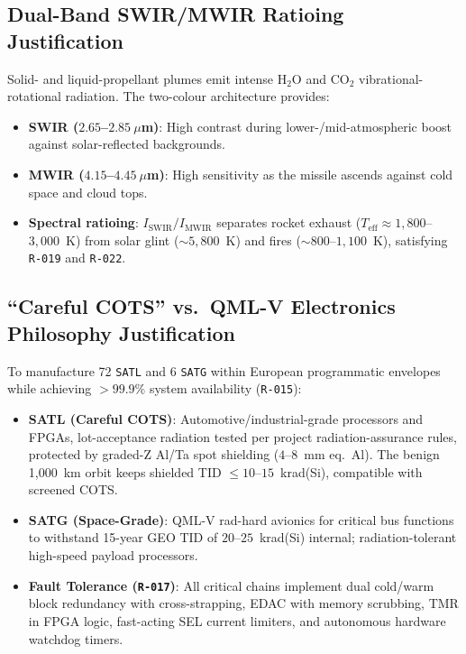 \subsection{Dual-Band SWIR/MWIR Ratioing Justification}

Solid- and liquid-propellant plumes emit intense $\mathrm{H_2O}$ and $\mathrm{CO_2}$ vibrational-rotational radiation. The two-colour architecture provides:
\begin{itemize}
    \item \textbf{SWIR ($2.65$--$2.85~\mu$m)}: High contrast during lower-/mid-atmospheric boost against solar-reflected backgrounds.
    \item \textbf{MWIR ($4.15$--$4.45~\mu$m)}: High sensitivity as the missile ascends against cold space and cloud tops.
    \item \textbf{Spectral ratioing}: $I_{\text{SWIR}}/I_{\text{MWIR}}$ separates rocket exhaust ($T_{\text{eff}} \approx 1{,}800$--$3{,}000$~K) from solar glint (${\sim}5{,}800$~K) and fires (${\sim}800$--$1{,}100$~K), satisfying \texttt{R-019} and \texttt{R-022}.
\end{itemize}

\subsection{``Careful COTS'' vs.\ QML-V Electronics Philosophy Justification}

To manufacture 72 \texttt{SATL} and 6 \texttt{SATG} within European programmatic envelopes while achieving $> 99.9\%$ system availability (\texttt{R-015}):
\begin{itemize}
    \item \textbf{SATL (Careful COTS)}: Automotive/industrial-grade processors and FPGAs, lot-acceptance radiation tested per project radiation-assurance rules, protected by graded-Z Al/Ta spot shielding ($4$--$8$~mm eq.\ Al). The benign 1,000~km orbit keeps shielded TID $\le 10$--$15$~krad(Si), compatible with screened COTS.
    \item \textbf{SATG (Space-Grade)}: QML-V rad-hard avionics for critical bus functions to withstand 15-year GEO TID of $20$--$25$~krad(Si) internal; radiation-tolerant high-speed payload processors.
    \item \textbf{Fault Tolerance (\texttt{R-017})}: All critical chains implement dual cold/warm block redundancy with cross-strapping, EDAC with memory scrubbing, TMR in FPGA logic, fast-acting SEL current limiters, and autonomous hardware watchdog timers.
\end{itemize}


